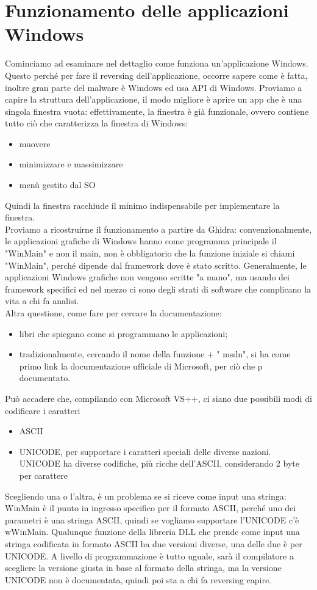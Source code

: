 \documentclass[12pt, oneside]{extbook}
\begin{document}
\section{Funzionamento delle applicazioni Windows}
Cominciamo ad esaminare nel dettaglio come funziona un'applicazione Windows. Questo perché per fare il reversing dell'applicazione, occorre sapere come è fatta, inoltre gran parte del malware è Windows ed usa API di Windows. Proviamo a capire la struttura dell'applicazione, il modo migliore è aprire un app che è una singola finestra vuota: effettivamente, la finestra è già funzionale, ovvero contiene tutto ciò che caratterizza la finestra di Windows:
\begin{itemize}
\item muovere
\item minimizzare e massimizzare
\item menù gestito dal SO
\end{itemize}
Quindi la finestra racchiude il minimo indispensabile per implementare la finestra.\\ Proviamo a ricostruirne il funzionamento a partire da Ghidra: convenzionalmente, le applicazioni grafiche di Windows hanno come programma principale il "WinMain" e non il main, non è obbligatorio che la funzione iniziale si chiami "WinMain", perché dipende dal framework dove è stato scritto. Generalmente, le applicazioni Windows grafiche non vengono scritte "a mano", ma usando dei framework specifici ed nel mezzo ci sono degli strati di software che complicano la vita a chi fa analisi.\\ Altra questione, come fare per cercare la documentazione: 
\begin{itemize}
\item libri che spiegano come si programmano le applicazioni;
\item tradizionalmente, cercando il nome della funzione + " msdn", si ha come primo link la documentazione ufficiale di Microsoft, per ciò che p documentato. 
\end{itemize}
Può accadere che, compilando con Microsoft VS++, ci siano due possibili modi di codificare i caratteri
\begin{itemize}
\item ASCII
\item UNICODE, per supportare i caratteri speciali delle diverse nazioni. UNICODE ha diverse codifiche, più ricche dell'ASCII, considerando 2 byte per carattere
\end{itemize}
Scegliendo una o l'altra, è un problema se si riceve come input una stringa: WinMain è il punto in ingresso specifico per il formato ASCII, perché uno dei parametri è una stringa ASCII, quindi se vogliamo supportare l'UNICODE c'è wWinMain. Qualunque funzione della libreria DLL che prende come input una stringa codificata in formato ASCII ha due versioni diverse, una delle due è per UNICODE. A livello di programmazione è tutto uguale, sarà il compilatore a scegliere la versione giusta in base al formato della stringa, ma la versione UNICODE non è documentata, quindi poi sta a chi fa reversing capire.\\
\end{document}
